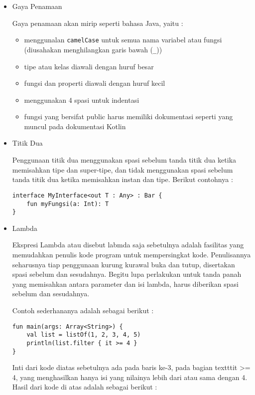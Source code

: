 \begin{itemize}
	\item Gaya Penamaan
	
Gaya penamaan akan mirip seperti bahasa Java, yaitu :

		\begin{itemize}
			\item menggunalan \texttt{camelCase} untuk semua nama variabel atau fungsi (diusahakan menghilangkan garis bawah (\texttt{\_}))
			\item tipe atau kelas diawali dengan huruf besar
			\item fungsi dan properti diawali dengan huruf kecil
			\item menggunakan 4 spasi untuk indentasi
			\item fungsi yang bersifat public harus memiliki dokumentasi seperti yang muncul pada dokumentasi Kotlin
		\end{itemize}	
	
	\item Titik Dua
	
Penggunaan titik dua menggunakan spasi sebelum tanda titik dua ketika memisahkan tipe dan super-tipe, dan tidak menggunakan spasi sebelum tanda titik dua ketika memisahkan instan dan tipe. Berikut contohnya :

\begin{lstlisting}
interface MyInterface<out T : Any> : Bar {
	fun myFungsi(a: Int): T
}
\end{lstlisting}	
	
	\item Lambda
	
Ekspresi Lambda atau disebut labmda saja sebetulnya adalah fasilitas yang memudahkan penulis kode program untuk mempersingkat kode. Penulisannya seharusnya tiap penggunaan kurung kurawal buka dan tutup, disertakan spasi sebelum dan sesudahnya. Begitu lupa perlakukan untuk tanda panah yang memisahkan antara parameter dan isi lambda, harus diberikan spasi sebelum dan sesudahnya.

Contoh sederhananya adalah sebagai berikut :

\begin{lstlisting}
fun main(args: Array<String>) {
	val list = listOf(1, 2, 3, 4, 5)
	println(list.filter { it >= 4 }
}
\end{lstlisting}	

Inti dari kode diatas sebetulnya ada pada baris ke-3, pada bagian texttt{it >= 4}, yang menghasilkan hanya isi yang nilainya lebih dari atau sama dengan 4. Hasil dari kode di atas adalah sebagai berikut : 


\end{itemize}
